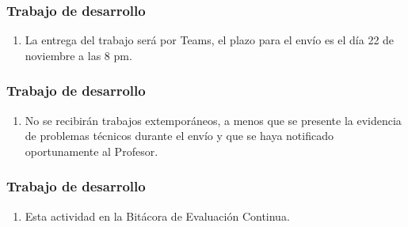 \documentclass[14pt]{beamer}
\begin{document}
\begin{frame}
\frametitle{Trabajo de desarrollo}
\begin{enumerate}[<+->]
\conti
\item La entrega del trabajo será por Teams, el plazo para el envío es el día 22 de noviembre a las 8 pm.
\seti
\end{enumerate}
\end{frame}
\begin{frame}
\frametitle{Trabajo de desarrollo}
\begin{enumerate}[<+->]
\conti
\item No se recibirán trabajos extemporáneos, a menos que se presente la evidencia de problemas técnicos durante el envío y que se haya notificado oportunamente al Profesor.
\seti
\end{enumerate}
\end{frame}
\begin{frame}
\frametitle{Trabajo de desarrollo}
\begin{enumerate}[<+->]
\conti
\item Esta actividad  en la Bitácora de Evaluación Continua.
\end{enumerate}
\end{frame}
\end{document}
